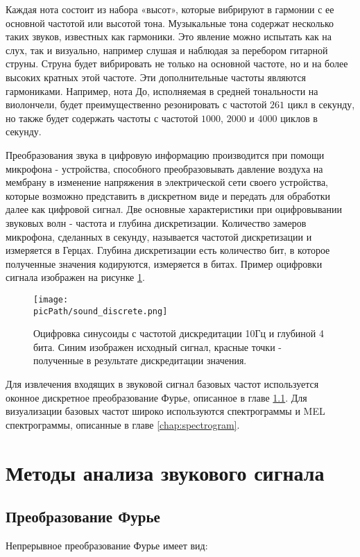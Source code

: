 \documentclass[oneside,final,14pt]{extreport}
\newcommand{\picPath}{pictures}
\begin{document}
Каждая нота состоит из набора «высот», которые вибрируют в гармонии с ее основной частотой или высотой тона. Музыкальные тона содержат несколько таких звуков, известных как гармоники. Это явление можно испытать как на слух, так и визуально, например слушая и наблюдая за перебором гитарной струны. Струна будет вибрировать не только на основной частоте, но и на более высоких кратных этой частоте. Эти дополнительные частоты являются гармониками. Например, нота До, исполняемая в средней тональности на виолончели, будет преимущественно резонировать с частотой $261$ цикл в секунду, но также будет содержать частоты с частотой $1000$, $2000$ и $4000$ циклов в секунду.


Преобразования звука в цифровую информацию производится при помощи микрофона - устройства, способного преобразовывать давление воздуха на мембрану в изменение напряжения в электрической сети своего устройства, которые возможно представить в дискретном виде и передать для обработки далее как цифровой сигнал. Две основные характеристики при оцифровывании звуковых волн - частота и глубина дискретизации. Количество замеров микрофона, сделанных в секунду, называется частотой дискретизации и измеряется в Герцах. Глубина дискретизации есть количество бит, в которое полученные значения кодируются, измеряется в битах. Пример оцифровки сигнала изображен на рисунке \ref{pic:wav_ex}.

\begin{figure}[H]
\begin{center}
\texttt{[image: \\picPath/sound\_discrete.png]}
\end{center}
  \caption{Оцифровка синусоиды с частотой дискредитации 10Гц и глубиной 4 бита. Синим изображен исходный сигнал, красные точки - полученные в результате дискредитации значения.}
  \label{pic:wav_ex}
  \end{figure}


    Для извлечения входящих в звуковой сигнал базовых частот используется оконное дискретное преобразование Фурье, описанное в главе \ref{chap:Fourier}. Для визуализации базовых частот широко используются спектрограммы и MEL спектрограммы, описанные в главе \ref{chap:spectrogram}.

\section{Методы анализа звукового сигнала} 
\subsection{Преобразование Фурье}
\label{chap:Fourier}
Непрерывное преобразование Фурье имеет вид: 
\end{document}
